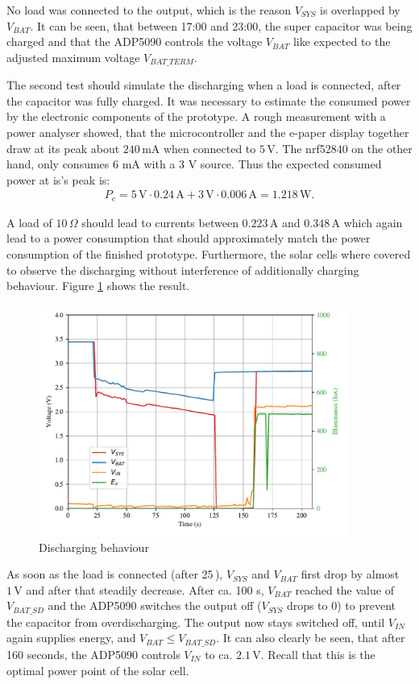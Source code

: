 No load was connected to the output, which is the reason $V_{SYS}$ is overlapped by $V_{BAT}$.
It can be seen, that between 17:00 and 23:00, the super capacitor was being charged and
that the ADP5090 controls the voltage $V_{BAT}$ like expected to the adjusted maximum voltage $V_{BAT\_TERM}$.

The second test should simulate the discharging when a load is connected, after the capacitor was fully charged.
It was necessary to estimate the consumed power by the electronic components of the prototype.
A rough measurement with a power analyser showed, that the microcontroller and the e-paper display together draw at its peak about $240\,\text{mA}$ when connected to $5\,\text{V}$. The nrf52840 on the other hand, only consumes 6 mA with a 3 V source. Thus the expected consumed power at is's peak is:
\begin{align}
	P_{e} = 5\,\text{V}\cdot 0.24\,\text{A} + 3\,\text{V}\cdot 0.006\,\text{A} = 1.218\,\text{W}.
\end{align}
  

A load of $10\,\Omega$ should lead to currents between $0.223\,\text{A}$ and $0.348\,\text{A}$ which again lead to a power consumption that should approximately match the power consumption of the finished prototype.
Furthermore, the solar cells where covered to observe the discharging without interference of additionally charging behaviour.
Figure \ref{development:discharge} shows the result.
 
\begin{figure}[ht]
	\centering
	\includegraphics[width=0.9\textwidth]{5-development/hardware/graphics/entladen.pdf}
	\caption{Discharging behaviour\label{development:discharge}}
\end{figure}

As soon as the load is connected (after 25\,), $V_{SYS}$ and $V_{BAT}$ first drop by almost $1\,\text{V}$ and after that steadily decrease.
After ca. 100 s, $V_{BAT}$ reached the value of $V_{BAT\_SD}$ and the ADP5090 switches the output off ($V_{SYS}$ drops to 0) to prevent the capacitor from overdischarging.
The output now stays switched off, until $V_{IN}$ again supplies energy, and $V_{BAT} \le V_{BAT\_SD}$.
It can also clearly be seen, that after 160 seconds, the ADP5090 controls $V_{IN}$ to ca. $2.1\,\text{V}$. Recall that this is the optimal power point of the solar cell.
